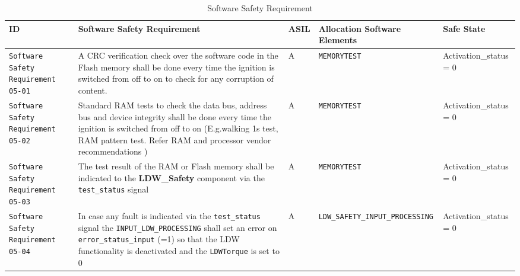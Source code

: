 \begin{table}[!htpb]
\caption{Software Safety Requirement}
\begin{center}
\scriptsize
\renewcommand{\arraystretch}{1.4}
\hspace*{-2.0cm}
\begin{tabular}{ L{1.7cm}|L{5.2cm}|L{0.5cm}|L{5.2cm}|L{3.0cm}  }
\hline
{}
ID &
Software Safety Requirement  &
ASIL &
Allocation Software Elements  &  
Safe State \\\hline
\textcolor{harmonia-blue}{\texttt{Software Safety Requirement 05-01}}  &
A CRC verification check over the software code in the Flash memory shall be
done every time the ignition is switched from off to on to check for any
corruption of content.	
&
A &
\texttt{MEMORYTEST}  &
Activation\_status = 0
\\\hline
\textcolor{harmonia-blue}{\texttt{Software Safety Requirement 05-02}}  &
Standard RAM tests to check the data bus, address bus and device integrity
shall be done every time the ignition is switched from off to on (E.g.walking
1s test, RAM pattern test. Refer RAM and processor vendor recommendations )
&
A &
\texttt{MEMORYTEST}  &
Activation\_status = 0
\\\hline
\textcolor{harmonia-blue}{\texttt{Software Safety Requirement 05-03}}  &
The test result of the RAM or Flash memory shall be indicated to the 
\textbf{LDW\_Safety}
component via the 
\textcolor{dark-red}{\texttt{test\_status}} signal	
&
A &
\texttt{MEMORYTEST} &
Activation\_status = 0
\\\hline
\textcolor{harmonia-blue}{\texttt{Software Safety Requirement 05-04}}  &
In case any fault is indicated via the 
\textcolor{dark-red}{\texttt{test\_status}} 
signal the
\textcolor{dark-red}{\texttt{INPUT\_LDW\_PROCESSING}}
shall set an error on 
\textcolor{dark-red}{\texttt{error\_status\_input}} (=1) so that
the LDW functionality is deactivated and the 
\textcolor{dark-red}{\texttt{LDWTorque}}
is set to 0	
&
A &
\texttt{LDW\_SAFETY\_INPUT\_PROCESSING} &
Activation\_status = 0
\\\hline
\end{tabular}
\end{center}
\label{tab:sr05}
\end{table}

